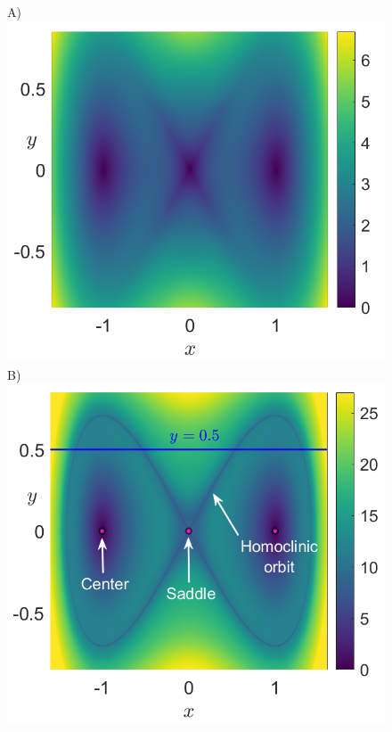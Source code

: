 \documentclass[8pt]{article}
\begin{document}
\begin{figure}[htbp]
	\begin{center}
		A)\includegraphics[scale=0.24]{duffing_tau_2.png}
		B)\includegraphics[scale=0.24]{duffing_tau_10.png}

\end{center}
\end{figure}
\end{document}
